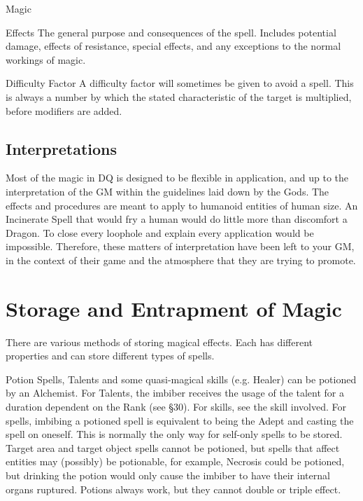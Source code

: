 \begin{Chapter}{Magic}
\begin{Description}
\item[Effects]  The  general  purpose  and  consequences  of 
the  spell.  Includes  potential  damage,  effects  of 
resistance,  special  effects,  and  any  exceptions  to 
the normal workings of magic. 

\item[Difficulty Factor] A difficulty factor will sometimes be given
  to avoid a spell.  This is always a number by which the stated
  characteristic of the target is multiplied, before modifiers are
  added.

\end{Description}
  
\subsection{Interpretations}

Most of the magic in DQ is designed to be flexible in application, and
up to the interpretation of the GM within the guidelines laid down by
the Gods.  The effects and procedures are meant to apply to humanoid
entities of human size.  An Incinerate Spell that would fry a human
would do little more than discomfort a Dragon. To close every loophole
and explain every application would be impossible.  Therefore, these
matters of interpretation have been left to your GM, in the context of
their game and the atmosphere that they are trying to promote.


\section{Storage and Entrapment of Magic}

There are various methods of storing magical effects.  Each has
different properties and can store different types of spells.

\begin{Description}

\item[Potion] Spells, Talents and some quasi-magical skills (e.g.
  Healer) can be potioned by an Alchemist.  For Talents, the imbiber
  receives the usage of the talent for a duration dependent on the
  Rank (see §30).  For skills, see the skill involved.  For spells,
  imbibing a potioned spell is equivalent to being the Adept and
  casting the spell on oneself.  This is normally the only way for
  self-only spells to be stored.  Target area and target object spells
  cannot be potioned, but spells that affect entities may (possibly)
  be potionable, for example, Necrosis could be potioned, but drinking
  the potion would only cause the imbiber to have their internal
  organs ruptured.  Potions always work, but they cannot double or
  triple effect.


\end{Description}
\end{Chapter}
